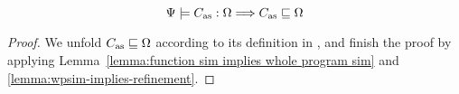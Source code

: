 \begin{lemma}
    \em
    \label{lemma:Simulation Implies Primitive Correctness}
    \[
        {\Psi} \models {C_{\text{as}}} : {\Omega}
        \Longrightarrow
        C_{\text{as}} \sqsubseteq \Omega
    \]
\end{lemma}
\begin{proof}
    We unfold $C_{\text{as}} \sqsubseteq \Omega$ according to 
    its definition in \Def{\ref{def:prim-correctness}}, 
    and finish the proof by applying 
    Lemma~\ref{lemma:function sim implies whole program sim} 
    and \ref{lemma:wpsim-implies-refinement}.
\end{proof}

